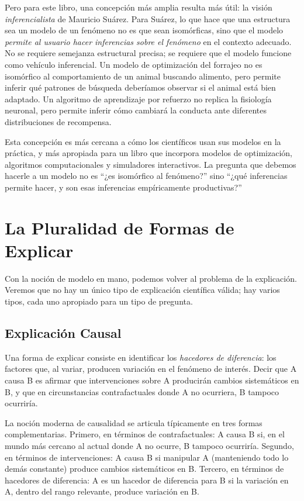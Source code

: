 \documentclass[
  letterpaper,
  DIV=11,
  numbers=noendperiod]{scrreprt}
\begin{document}
Pero para este libro, una concepción más amplia resulta más útil: la
visión \emph{inferencialista} de Mauricio Suárez. Para Suárez, lo que
hace que una estructura sea un modelo de un fenómeno no es que sean
isomórficas, sino que el modelo \emph{permite al usuario hacer
inferencias sobre el fenómeno} en el contexto adecuado. No se requiere
semejanza estructural precisa; se requiere que el modelo funcione como
vehículo inferencial. Un modelo de optimización del forrajeo no es
isomórfico al comportamiento de un animal buscando alimento, pero
permite inferir qué patrones de búsqueda deberíamos observar si el
animal está bien adaptado. Un algoritmo de aprendizaje por refuerzo no
replica la fisiología neuronal, pero permite inferir cómo cambiará la
conducta ante diferentes distribuciones de recompensa.

Esta concepción es más cercana a cómo los científicos usan sus modelos
en la práctica, y más apropiada para un libro que incorpora modelos de
optimización, algoritmos computacionales y simuladores interactivos. La
pregunta que debemos hacerle a un modelo no es ``¿es isomórfico al
fenómeno?'' sino ``¿qué inferencias permite hacer, y son esas
inferencias empíricamente productivas?''

\section{La Pluralidad de Formas de
Explicar}\label{la-pluralidad-de-formas-de-explicar}

Con la noción de modelo en mano, podemos volver al problema de la
explicación. Veremos que no hay un único tipo de explicación científica
válida; hay varios tipos, cada uno apropiado para un tipo de pregunta.

\subsection{Explicación Causal}\label{explicaciuxf3n-causal}

Una forma de explicar consiste en identificar los \emph{hacedores de
diferencia}: los factores que, al variar, producen variación en el
fenómeno de interés. Decir que A causa B es afirmar que intervenciones
sobre A producirán cambios sistemáticos en B, y que en circunstancias
contrafactuales donde A no ocurriera, B tampoco ocurriría.

La noción moderna de causalidad se articula típicamente en tres formas
complementarias. Primero, en términos de contrafactuales: A causa B si,
en el mundo más cercano al actual donde A no ocurre, B tampoco
ocurriría. Segundo, en términos de intervenciones: A causa B si
manipular A (manteniendo todo lo demás constante) produce cambios
sistemáticos en B. Tercero, en términos de hacedores de diferencia: A es
un hacedor de diferencia para B si la variación en A, dentro del rango
relevante, produce variación en B.
\end{document}
